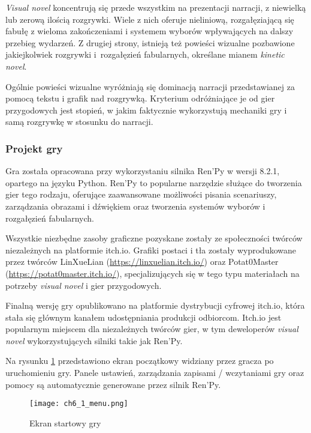\textit{Visual novel} koncentrują się przede wszystkim na prezentacji narracji, z niewielką lub zerową
ilością rozgrywki. Wiele z nich oferuje nieliniową, rozgałęziającą się fabułę z wieloma
zakończeniami i systemem wyborów wpływających na dalszy przebieg wydarzeń\cite{tvtropes_visual_novel}.
Z drugiej strony, istnieją też powieści wizualne
pozbawione jakiejkolwiek rozgrywki i~rozgałęzień fabularnych, określane mianem
\textit{kinetic novel}\cite{tvtropes_kinetic_novel}.

Ogólnie powieści wizualne wyróżniają się dominacją narracji przedstawianej za pomocą tekstu i grafik nad
rozgrywką. Kryterium odróżniające je od gier przygodowych jest stopień, w jakim faktycznie
wykorzystują mechaniki gry i samą rozgrywkę w stosunku do narracji\cite{tvtropes_visual_novel}.

\subsubsection*{Projekt gry}

Gra została opracowana przy wykorzystaniu silnika Ren'Py w wersji 8.2.1, opartego na języku Python.
Ren'Py to popularne narzędzie służące do tworzenia gier tego rodzaju, oferujące zaawansowane
możliwości pisania scenariuszy, zarządzania obrazami i dźwiękiem oraz tworzenia systemów wyborów
i rozgałęzień fabularnych.

Wszystkie niezbędne zasoby graficzne pozyskane zostały ze społeczności twórców niezależnych na
platformie itch.io. Grafiki postaci i tła zostały wyprodukowane przez twórców
LinXueLian (\url{https://linxuelian.itch.io/}) oraz Potat0Master (\url{https://potat0master.itch.io/}),
specjalizujących się w tego typu materiałach na potrzeby \textit{visual novel} i gier przygodowych.

Finalną wersję gry opublikowano na platformie dystrybucji cyfrowej itch.io, która stała się
głównym kanałem udostępniania produkcji odbiorcom. Itch.io jest popularnym miejscem dla niezależnych
twórców gier, w tym deweloperów \textit{visual novel} wykorzystujących silniki takie jak Ren'Py.

Na rysunku \ref{fig:ch6_1_menu} przedstawiono ekran początkowy widziany przez gracza po uruchomieniu
gry. Panele ustawień, zarządzania zapisami / wczytaniami gry oraz pomocy są automatycznie generowane
przez silnik Ren'Py.

\begin{figure}[h!]
    \centering
    \texttt{[image: ch6\_1\_menu.png]}
    \caption{Ekran startowy gry}
    \label{fig:ch6_1_menu}
\end{figure}

